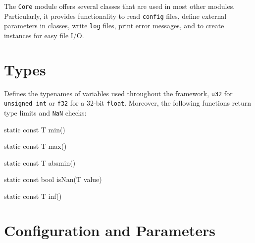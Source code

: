 The \texttt{Core} module offers several classes that are used in most other modules. Particularly, it provides functionality to read \texttt{config} files, define external parameters in classes, write \texttt{log} files, print error messages, and to create instances for easy file I/O.

\section{Types}


Defines the typenames of variables used throughout the framework, \eg \texttt{u32} for \texttt{unsigned int} or \texttt{f32} for a $ 32 $-bit \texttt{float}. Moreover, the following functions return type limits and \texttt{NaN} checks:

\begin{fdoc}{static const T min()}
\end{fdoc}

\begin{fdoc}{static const T max()}
\end{fdoc}

\begin{fdoc}{static const T absmin()}
\end{fdoc}

\begin{fdoc}{static const bool isNan(T value)}
\end{fdoc}

\begin{fdoc}{static const T inf()}
\end{fdoc}


\section{Configuration and Parameters}


